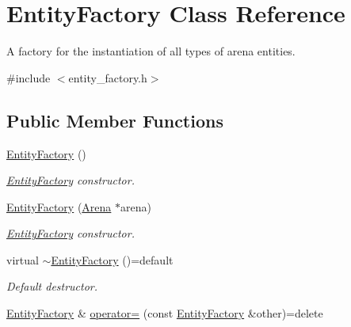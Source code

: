 \hypertarget{classEntityFactory}{}\section{Entity\+Factory Class Reference}
\label{classEntityFactory}


A factory for the instantiation of all types of arena entities.  




{\ttfamily \#include $<$entity\+\_\+factory.\+h$>$}

\subsection*{Public Member Functions}
\begin{DoxyCompactItemize}
\item 
\hyperlink{classEntityFactory_abaf0c4ceaa682e55f69b0ceae230008a}{Entity\+Factory} ()\hypertarget{classEntityFactory_abaf0c4ceaa682e55f69b0ceae230008a}{}\label{classEntityFactory_abaf0c4ceaa682e55f69b0ceae230008a}

\begin{DoxyCompactList}\small\item\em \hyperlink{classEntityFactory}{Entity\+Factory} constructor. \end{DoxyCompactList}\item 
\hyperlink{classEntityFactory_a1024ee8dbdf4439627607cf35b692ea1}{Entity\+Factory} (\hyperlink{classArena}{Arena} $\ast$arena)\hypertarget{classEntityFactory_a1024ee8dbdf4439627607cf35b692ea1}{}\label{classEntityFactory_a1024ee8dbdf4439627607cf35b692ea1}

\begin{DoxyCompactList}\small\item\em \hyperlink{classEntityFactory}{Entity\+Factory} constructor. \end{DoxyCompactList}\item 
virtual \hyperlink{classEntityFactory_ae3246f06fa101178803f76582323d4ad}{$\sim$\+Entity\+Factory} ()=default\hypertarget{classEntityFactory_ae3246f06fa101178803f76582323d4ad}{}\label{classEntityFactory_ae3246f06fa101178803f76582323d4ad}

\begin{DoxyCompactList}\small\item\em Default destructor. \end{DoxyCompactList}\item 
\hyperlink{classEntityFactory}{Entity\+Factory} \& \hyperlink{classEntityFactory_ac68bab4dc14f17dd3f58314a3db2e444}{operator=} (const \hyperlink{classEntityFactory}{Entity\+Factory} \&other)=delete\hypertarget{classEntityFactory_ac68bab4dc14f17dd3f58314a3db2e444}{}\label{classEntityFactory_ac68bab4dc14f17dd3f58314a3db2e444}


\end{DoxyCompactItemize}
